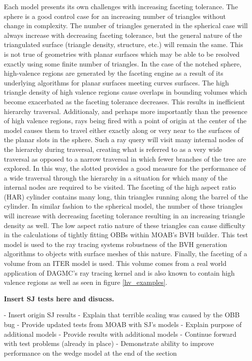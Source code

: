 \documentclass[12pt, a4paper]{article}
\begin{document}
Each model presents its own challenges with increasing faceting tolerance. The sphere is a good control case for an increasing number of triangles without change in complexity. The number of triangles generated in the spherical case will always increase with decreasing faceting tolerance, but the general nature of the triangulated surface (triangle density, structure, etc.) will remain the same. This is not true of geometries with planar surfaces which may be able to be resolved exactly using some finite number of triangles. In the case of the notched sphere, high-valence regions are generated by the faceting engine as a result of its underlying algorithms for planar surfaces meeting curves surfaces. The high triangle density of high valence regions cause overlaps in bounding volumes which become exacerbated as the faceting tolerance decreases. This results in inefficient hierarchy traversal. Additionaly, and perhaps more importantly than the presence of high valence regions, rays being fired with a point of origin at the center of the model causes them to travel either exactly along or very near to the surfaces of the planar slots in the sphere. Such a ray query will visit many internal nodes of the hierarchy during traversal, creating what is referred to as a very wide traversal as opposed to a narrow traversal in which fewer branches of the tree are explored. In this way, the slotted provides a good measure for the performance of a wide traversal through the hierarchy in a situation for which many of the internal nodes are required to be visited. The faceting of the high aspect ratio (HAR) cylinder contains many long, thin triangles running along the barrel of the cylinder. In similar fashion to the spherical model, the number of these triangles will increase with decreasing faceting tolerance resulting in an increasing triangle density as well. The low aspect ratio nature of these triangles can cause difficulty in the calculations of tightly fitting OBBs within MOAB's BVH builder. This test model is used to the ray tracing systems robustness of the BVH generation algorithms to objects with surface meshes of this nature. Finally, the faceting of a volume from an ITER model is used. This volume comes from a real world application of DAGMC's ray tracing kernel and is also known to contain high valence regions as well as seen in figure \ref{hv_examples}.

\textbf{Insert SJ tests here and disucss.}

- Insert origin SJ results
- Explain that terrible scaling was caused by the OBB bug
- Provide updated tests from MOAB with SJ's models
- Explain purpose of additional models
- Provide results with additional models
- Continue forward with test problems (already in place)
- Demonstrate ability to improve performance on the wedge model at the end of the section
\end{document}
